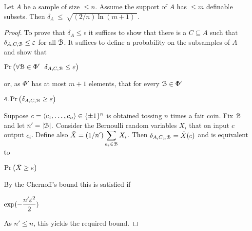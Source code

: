 \documentclass[sputnik.tex]{subfiles}
\begin{document}
\begin{lemma}\label{lem_discrepanzarandom} 
Let $A$ be a sample of size $\le n$. Assume the support of $A$ has $\le m$  definable subsets. Then $\delta_A\ \le\ \sqrt{(2/n)\ln(m+1)\;}$.
\end{lemma}

\begin{proof}
\def\ceq#1#2#3{\parbox[t]{40ex}{$\displaystyle #1$}\medrel{#2}{$\displaystyle #3$}}
To prove that $\delta_A\le\epsilon$ it suffices to show that there is a $C\subseteq A$ such that $\delta_{A,C,\EuScript B}\le\varepsilon$ for all $\EuScript B$.  It suffices to define a probability on the subsamples of $A$ and show that

\ceq{\hfill \Pr\big(\A\B\in\Phi'\ \ \delta_{A,C,\B}\le \epsilon\big)}{>}{0}

or, as $\Phi'$ has at most $m+1$ elements, that for every $\EuScript B\in\Phi'$

\ceq{\ssf{4.}\hfill\Pr\big(\delta_{A,C,\B}\ge\epsilon\big)}{\le}{\frac1{m+2}.}


Suppose $c=\langle c_1,\dots,c_n\rangle\in\{\pm1\}^n$ is obtained tossing $n$ times a fair coin. Fix $\EuScript B$ and let $n'=|\EuScript B|$. Consider the Bernoulli random variables $X_i$ that on input $c$ output $c_i$. Define also $\displaystyle\bar X=(1/n')\sum_{a_i\in\EuScript B} X_i$. Then $\delta_{A,C_c,\EuScript B}=\bar X(c)$ and  is equivalent to

\ceq{\hfill\Pr\big(\bar X\ge\epsilon\big)}{\le}{\frac1{m+2}.}


By the Chernoff's bound this is satisfied if 


\ceq{\hfill\exp(-\frac{n'\epsilon^2}{2})}{\le}{\frac1{m+2}.}

As $n'\le n$, this yields the required bound.\end{proof}
\end{document}
